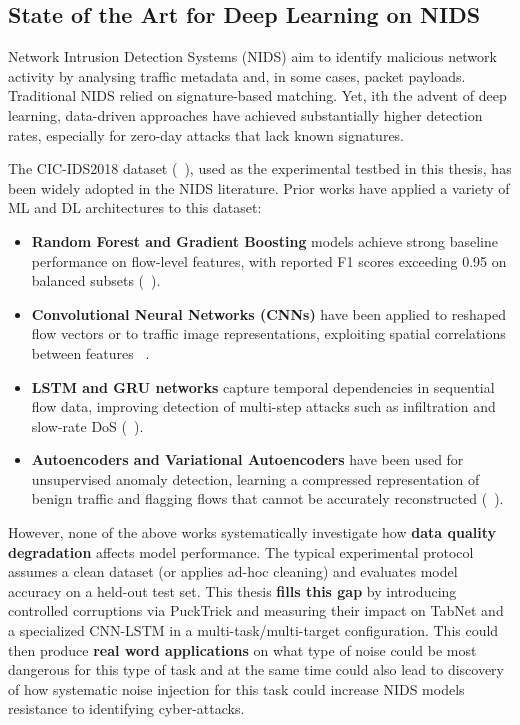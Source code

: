 \documentclass[../main.tex]{subfiles}
\begin{document}
\subsection{State of the Art for Deep Learning on NIDS}
\label{sec:dq-impact}

Network Intrusion Detection Systems (NIDS) aim to identify malicious network activity by analysing traffic metadata and, in some cases, packet payloads. Traditional NIDS relied on signature-based matching.  Yet, ith the advent of deep learning,
data-driven approaches have achieved substantially higher detection rates,
especially for zero-day attacks that lack known signatures.

The CIC-IDS2018 dataset (~\supercite{cicids2018}), used as the experimental testbed in
this thesis, has been widely adopted in the NIDS literature.  Prior works have
applied a variety of ML and DL architectures to this dataset:

\begin{itemize}
    \item \textbf{Random Forest and Gradient Boosting} models achieve strong
          baseline performance on flow-level features, with reported F1 scores
          exceeding 0.95 on balanced subsets (~\supercite{sharafaldin2018toward}).
    \item \textbf{Convolutional Neural Networks (CNNs)} have been applied to
          reshaped flow vectors or to traffic image representations, exploiting
          spatial correlations between features ~\supercite{kim2020cnn}.
    \item \textbf{LSTM and GRU networks} capture temporal dependencies in
          sequential flow data, improving detection of multi-step attacks such
          as infiltration and slow-rate DoS (~\supercite{imrana2021bidirectional}).
    \item \textbf{Autoencoders and Variational Autoencoders} have been used
          for unsupervised anomaly detection, learning a compressed
          representation of benign traffic and flagging flows that cannot be
          accurately reconstructed (~\supercite{mirsky2018kitsune}).
\end{itemize}

However, none of the above works systematically investigate how \textbf{data
quality degradation} affects model performance.  The typical experimental
protocol assumes a clean dataset (or applies ad-hoc cleaning) and evaluates
model accuracy on a held-out test set.  This thesis \textbf{fills this gap} by
introducing controlled corruptions via PuckTrick and measuring their impact on
TabNet and a specialized CNN-LSTM in a multi-task/multi-target configuration. 
This could then produce \textbf{real word applications} on what type of noise could be most dangerous for this type of task and at the same time could also lead to discovery of how systematic noise injection for this task could increase NIDS models resistance to identifying cyber-attacks.
\end{document}
